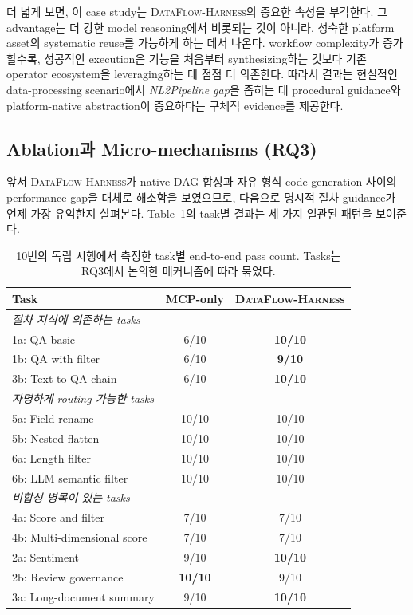 더 넓게 보면, 이 case study는 \textsc{DataFlow-Harness}의 중요한 속성을 부각한다. 그 advantage는 더 강한 model reasoning에서 비롯되는 것이 아니라, 성숙한 platform asset의 systematic reuse를 가능하게 하는 데서 나온다. workflow complexity가 증가할수록, 성공적인 execution은 기능을 처음부터 synthesizing하는 것보다 기존 operator ecosystem을 leveraging하는 데 점점 더 의존한다. 따라서 결과는 현실적인 data-processing scenario에서 \textit{NL2Pipeline gap}을 좁히는 데 procedural guidance와 platform-native abstraction이 중요하다는 구체적 evidence를 제공한다.


\subsection{Ablation과 Micro-mechanisms (\textbf{RQ3})}
앞서 \textsc{DataFlow-Harness}가 native DAG 합성과 자유 형식 code generation 사이의 performance gap을 대체로 해소함을 보였으므로, 다음으로 명시적 절차 guidance가 언제 가장 유익한지 살펴본다. Table~\ref{tab:per_task}의 task별 결과는 세 가지 일관된 패턴을 보여준다.

\begin{table}[t]
\centering
\small
\setlength{\tabcolsep}{8pt}
\begin{tabular}{lcc}
\toprule
\textbf{Task} & \textbf{MCP-only} & \textbf{\textsc{DataFlow-Harness}} \\
\midrule

\multicolumn{3}{l}{\emph{절차 지식에 의존하는 tasks}} \\
1a: QA basic            & 6/10 & \textbf{10/10} \\
1b: QA with filter      & 6/10 & \textbf{9/10} \\
3b: Text-to-QA chain    & 6/10 & \textbf{10/10} \\
\midrule

\multicolumn{3}{l}{\emph{자명하게 routing 가능한 tasks}} \\
5a: Field rename         & 10/10 & 10/10 \\
5b: Nested flatten       & 10/10 & 10/10 \\
6a: Length filter        & 10/10 & 10/10 \\
6b: LLM semantic filter  & 10/10 & 10/10 \\
\midrule

\multicolumn{3}{l}{\emph{비합성 병목이 있는 tasks}} \\
4a: Score and filter        & 7/10 & 7/10 \\
4b: Multi-dimensional score & 7/10 & 7/10 \\
2a: Sentiment               & 9/10 & \textbf{10/10} \\
2b: Review governance       & \textbf{10/10} & 9/10 \\
3a: Long-document summary   & 9/10 & \textbf{10/10} \\
\bottomrule
\end{tabular}

\caption{10번의 독립 시행에서 측정한 task별 end-to-end pass count. Tasks는 RQ3에서 논의한 메커니즘에 따라 묶었다.}

\label{tab:per_task}
\end{table}


